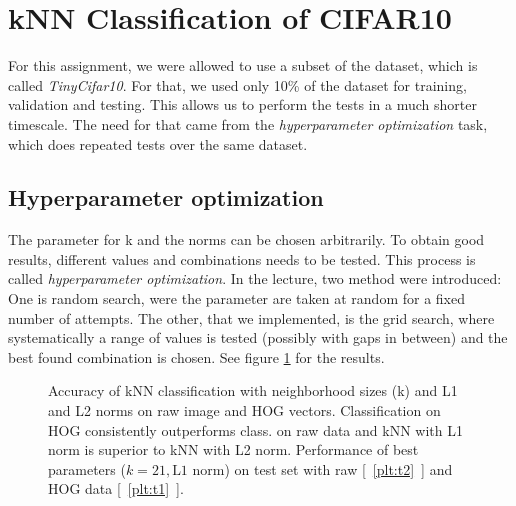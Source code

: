 \clearpage
\section{kNN Classification of CIFAR10} %
For this assignment, we were allowed to use a subset of the  dataset, which is called \emph{TinyCifar10}. For that, we used only 10\% of the dataset for training, validation and testing. This allows us to perform the tests in a much shorter timescale. The need for that came from the \emph{hyperparameter optimization} task, which does repeated tests over the same dataset.
\subsection{Hyperparameter optimization}
The parameter for k and the norms can be chosen arbitrarily. To obtain good results, different values and combinations needs to be tested. This process is called \emph{hyperparameter optimization}. In the lecture, two method were introduced: One is random search, were the parameter are taken at random for a fixed number of attempts. The other, that we implemented, is the grid search, where systematically a range of values is tested (possibly with gaps in between) and the best found combination is chosen. See figure \ref{figparam} for the results.

\begin{figure}[h!t]
\newcommand{\plotref}[1]{{[~\ref{plt:#1}~]}}
\centering

\caption{Accuracy of kNN classification with neighborhood sizes (k) and L1 and L2 norms on raw image and HOG vectors. Classification on HOG consistently outperforms class. on raw data and kNN with L1 norm is superior to kNN with L2 norm. Performance of best parameters ($k=21, \text{L1 norm}$) on test set with raw \plotref{t2} and HOG data \plotref{t1}. }
\label{figparam}

\end{figure}



\newpage




